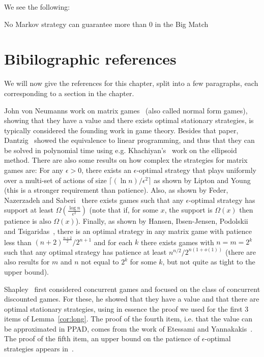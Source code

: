 We see the following:
\begin{lemma}\label{lemm:no_markov_meanpayoff}
No Markov strategy can guarantee more than $0$ in the Big Match
\end{lemma}

\section{Bibilographic references}%
We will now give the references for this chapter, split into a few paragraphs, each corresponding to a section in the chapter.

John von Neumanns work on matrix games~\cite{vonNeumann&Morgenstern:1944} (also called normal form games), showing that they have a value and there exists optimal stationary strategies, is typically considered the founding work in game theory. Besides that paper, Dantzig~\cite{Dantzig:1965} showed the equivalence to linear programming, and thus that they can be solved in polynomial time using e.g. Khachiyan's~\cite{Kha:1979} work on the ellipsoid method.
There are also some results on how complex the strategies for matrix games are: For any $\epsilon>0$, there exists an $\epsilon$-optimal strategy that plays uniformly over a multi-set of actions of size $\lceil (\ln n)/\epsilon^2\rceil$ as shown by Lipton and Young~\cite{Lipton&Young:1994} (this is a stronger requirement than patience).
Also, as shown by Feder, Nazerzadeh and Saberi~\cite{FNS:2007} there exists games such that any $\epsilon$-optimal strategy has support at least $\Omega(\frac{\log n}{\epsilon^2})$ (note that if, for some $x$, the support is $\Omega(x)$ then patience is also $\Omega(x)$).
Finally,  as shown by Hansen, Ibsen-Jensen, Podolskii and Tsigaridas~\cite{HIPT:2013}, there is an optimal strategy in any matrix game with patience less than $(n+2)^{\frac{n+2}{2}}/2^{n+1}$ and for each $k$ there exists games with $n=m=2^k$ such that any optimal strategy has patience at least $n^{n/2}/2^{n(1+o(1))}$ (there are also results for $m$ and $n$ not equal to $2^k$ for some $k$, but not quite as tight to the upper bound).

Shapley~\cite{Sha:1953} first considered concurrent games and focused on the class of concurrent discounted games. For these, he showed that they have a value and that there are optimal stationary strategies, using in essence the proof we used for the first 3 items of Lemma~\ref{cor:long}.
The proof of the fourth item, i.e. that the value can be approximated in PPAD, comes from the work of Etessami  and Yannakakis~\cite{EY:2007}. The proof of the fifth item, an upper bound on the patience of $\epsilon$-optimal strategies appears in~\cite{ibsenjensen:2012}.

